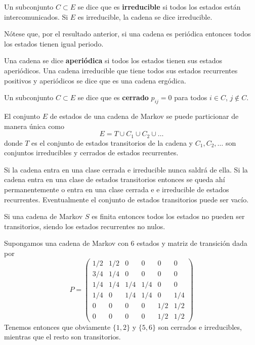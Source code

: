 \documentclass[PREyA.tex]{subfiles}
\begin{document}
\begin{defi}
Un subconjunto $C\subset E$ se dice que es \textbf{irreducible} si todos los estados están intercomunicados. Si $E$ es irreducible, la cadena se dice irreducible.
\end{defi}
\begin{nota}
Nótese que, por el resultado anterior, si una cadena es periódica entonces todos los estados tienen igual periodo.
\end{nota}
\begin{defi}
Una cadena se dice \textbf{aperiódica} si todos los estados tienen sus estados aperiódicos. Una cadena irreducible que tiene todos sus estados recurrentes positivos y aperiódicos se dice que es una cadena ergódica.
\end{defi}
\begin{defi}
Un subconjunto $C\subset E$ se dice que es \textbf{cerrado} $p_{ij}=0$ para todos $i\in C$, $j\not\in C$.
\end{defi}
\begin{theorem}
El conjunto $E$ de estados de una cadena de Markov se puede particionar de manera única como
$$
E=T\cup C_1\cup C_2 \cup \dotsc
$$
donde $T$ es el conjunto de estados transitorios de la cadena y $C_1,C_2,\dotsc$ son conjuntos irreducibles y cerrados de estados recurrentes.
\end{theorem}
\begin{nota}
Si la cadena entra en una clase cerrada e irreducible nunca saldrá de ella. Si la cadena entra en una clase de estados transitorios entonces se queda ahí permanentemente o entra en una clase cerrada e e irreducible de estados recurrentes. Eventualmente el conjunto de estados transitorios puede ser vacío.
\end{nota}
\begin{theorem}
Si una cadena de Markov $S$ es finita entonces todos los estados no pueden ser transitorios, siendo los estados recurrentes no nulos.
\end{theorem}
\begin{example}
Supongamos una cadena de Markov con $6$ estados y matriz de transición dada por 
$$
P=
\begin{pmatrix}
1/2 & 1/2 & 0 & 0 & 0 & 0\\
3/4 & 1/4 & 0 & 0 & 0 & 0\\
1/4 & 1/4 & 1/4 & 1/4 & 0 & 0\\
1/4 & 0 & 1/4 & 1/4 & 0 & 1/4\\
0 & 0 & 0 &0 & 1/2 & 1/2\\
0 & 0 & 0 &0 & 1/2 & 1/2
\end{pmatrix}
$$
Tenemos entonces que obviamente $\{1,2\}$ y $\{5,6\}$ son cerrados e irreducibles, mientras que el resto son transitorios.
\end{example}
\end{document}
